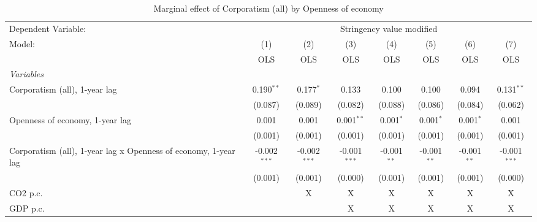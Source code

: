 
\begin{table}[htbp]
   \caption{Marginal effect of Corporatism (all) by Openness of economy}
   \centering
   \begin{tabular}{lccccccc}
      \toprule
      Dependent Variable: & \multicolumn{7}{c}{Stringency value modified}\\
      Model:                                                          & (1)            & (2)            & (3)            & (4)           & (5)           & (6)           & (7)\\  
                                                                      &  OLS           & OLS            & OLS            & OLS           & OLS           & OLS           & OLS\\  
      \midrule
      \emph{Variables}\\
      Corporatism (all), 1-year lag                                   & 0.190$^{**}$   & 0.177$^{*}$    & 0.133          & 0.100         & 0.100         & 0.094         & 0.131$^{**}$\\   
                                                                      & (0.087)        & (0.089)        & (0.082)        & (0.088)       & (0.086)       & (0.084)       & (0.062)\\   
      Openness of economy, 1-year lag                                 & 0.001          & 0.001          & 0.001$^{**}$   & 0.001$^{*}$   & 0.001$^{*}$   & 0.001$^{*}$   & 0.001\\   
                                                                      & (0.001)        & (0.001)        & (0.001)        & (0.001)       & (0.001)       & (0.001)       & (0.001)\\   
      Corporatism (all), 1-year lag x Openness of economy, 1-year lag & -0.002$^{***}$ & -0.002$^{***}$ & -0.001$^{***}$ & -0.001$^{**}$ & -0.001$^{**}$ & -0.001$^{**}$ & -0.001$^{***}$\\   
                                                                      & (0.001)        & (0.001)        & (0.000)        & (0.001)       & (0.001)       & (0.001)       & (0.000)\\   
      CO2 p.c.                                                        &                & X              & X              & X             & X             & X             & X\\  
      GDP p.c.                                                        &                &                & X              & X             & X             & X             & X\\  

\end{tabular}
\end{table}
